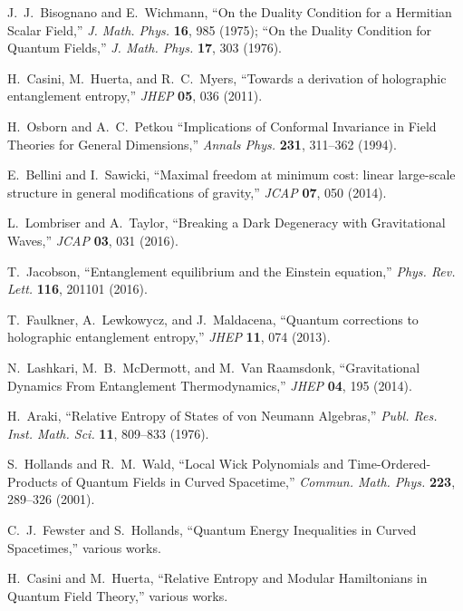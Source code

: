 \documentclass[aps,prd,onecolumn,superscriptaddress,nofootinbib]{revtex4-2}
\begin{document}

\begin{thebibliography}{99}

J.~J.~Bisognano and E.~Wichmann,
``On the Duality Condition for a Hermitian Scalar Field,'' \emph{J. Math. Phys.} \textbf{16}, 985 (1975);
``On the Duality Condition for Quantum Fields,'' \emph{J. Math. Phys.} \textbf{17}, 303 (1976).

H.~Casini, M.~Huerta, and R.~C.~Myers,
``Towards a derivation of holographic entanglement entropy,''
\emph{JHEP} \textbf{05}, 036 (2011).

H.~Osborn and A.~C.~Petkou
``Implications of Conformal Invariance in Field Theories for General Dimensions,''
\emph{Annals Phys.} \textbf{231}, 311–362 (1994).

E.~Bellini and I.~Sawicki,
``Maximal freedom at minimum cost: linear large-scale structure in general modifications of gravity,''
\emph{JCAP} \textbf{07}, 050 (2014).

L.~Lombriser and A.~Taylor,
``Breaking a Dark Degeneracy with Gravitational Waves,''
\emph{JCAP} \textbf{03}, 031 (2016).

T.~Jacobson,
``Entanglement equilibrium and the Einstein equation,''
\emph{Phys. Rev. Lett.} \textbf{116}, 201101 (2016).

T.~Faulkner, A.~Lewkowycz, and J.~Maldacena,
``Quantum corrections to holographic entanglement entropy,''
\emph{JHEP} \textbf{11}, 074 (2013).

N.~Lashkari, M.~B.~McDermott, and M.~Van Raamsdonk,
``Gravitational Dynamics From Entanglement Thermodynamics,''
\emph{JHEP} \textbf{04}, 195 (2014).

H.~Araki, ``Relative Entropy of States of von Neumann Algebras,''
\emph{Publ. Res. Inst. Math. Sci.} \textbf{11}, 809–833 (1976).

S.~Hollands and R.~M.~Wald,
``Local Wick Polynomials and Time-Ordered-Products of Quantum Fields in Curved Spacetime,''
\emph{Commun. Math. Phys.} \textbf{223}, 289–326 (2001).

C.~J.~Fewster and S.~Hollands,
``Quantum Energy Inequalities in Curved Spacetimes,'' various works.

H.~Casini and M.~Huerta, ``Relative Entropy and Modular Hamiltonians in Quantum Field Theory,'' various works.


\end{thebibliography}
\end{document}
